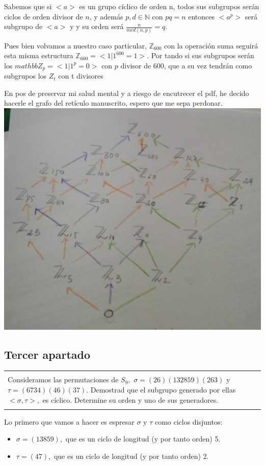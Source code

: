 \documentclass[12pt]{article}
\newenvironment{micaja}
{
    \begin{center}
    \begin{tabular}{|p{0.9\textwidth}|}
    \hline\\
    }   
    {   
    \\\\\hline
    \end{tabular} 
    \end{center}
    }
\begin{document}
Sabemos que si $<a>$ es un grupo cíclico de orden n, todos sus subgrupos serán ciclos de orden
divisor de $n$, y además  $p,d \in \mathbb N$ con $pq=n$ entonces $<a^p>$ será subgrupo de $<a>$ y 
y su orden será $\frac{n}{mcd(n,p)} = q.$

Pues bien volvamos a nuestro caso particular, $\mathbb Z_{600}$ con la operación suma seguirá esta misma estructura
 $\mathbb Z_{600} = <1 | 1^{600} = 1>$. 
Por tando si sus subgrupos serán los  $mathbb Z_{p} = <1 | 1^p = 0>$ con $p$ divisor de 600, que a su vez
tendrán como subgrupos los $Z_{t}$ con t divisores  

En pos de preservar mi salud mental y a riesgo de encutrecer el pdf, he decido hacerle el grafo del retículo
manuscrito, espero que me sepa perdonar. 
\includegraphics[width=\textwidth]{Z600}

\subsection{Tercer apartado}

\begin{micaja}
    Consideramos las permutaciones de $S_9,$
    $\sigma = (2 6)(132859)(263)$ y $\tau = (6734)(46)(37).$
    Demostrad que el subgrupo generado por ellas $<\sigma, \tau>,$ es cíclico. 
    Determine su orden y uno de sus generadores. 
\end{micaja}

Lo primero que vamos a hacer es espresar $\sigma$ y $\tau$ como ciclos disjuntos: 
\begin{itemize}
    \item $\sigma = (13859),$ que es un ciclo de longitud (y por tanto orden) 5.
    \item $\tau = (4 7),$ que es un ciclo de longitud (y por tanto orden) 2.
\end{itemize}
\end{document}
